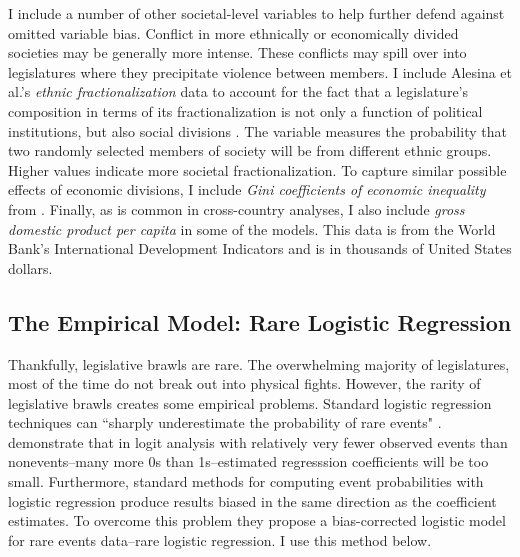 \documentclass[a4paper]{article}\usepackage{graphicx, color}
\begin{document}
I include a number of other societal-level variables to help further defend against omitted variable bias. Conflict in more ethnically or economically divided societies may be generally more intense. These conflicts may spill over into legislatures where they precipitate violence between members. I include Alesina et al.'s \citeyearpar{Alesina2003} {\emph{ethnic fractionalization}} data to account for the fact that a legislature's composition in terms of its fractionalization is not only a function of political institutions, but also social divisions \citep{Neto1997, Mozaffar2003}. The variable measures the probability that two randomly selected members of society will be from different ethnic groups. Higher values indicate more societal fractionalization. To capture similar possible effects of economic divisions, I include {\emph{Gini coefficients of economic inequality}} from \cite{UNU2008}. Finally, as is common in cross-country analyses, I also include {\emph{gross domestic product per capita}} in some of the models. This data is from the World Bank's International Development Indicators \citeyearpar{WorldBank2011} and is in thousands of United States dollars.

\subsection{The Empirical Model: Rare Logistic Regression}

Thankfully, legislative brawls are rare. The overwhelming majority of legislatures, most of the time do not break out into physical fights. However, the rarity of legislative brawls creates some empirical problems. Standard logistic regression techniques can ``sharply underestimate the probability of rare events" \cite[137]{KingRareEventsPA2001}. \cite{KingRareEventsPA2001} demonstrate that in logit analysis with relatively very fewer observed events than nonevents--many more 0s than 1s--estimated regresssion coefficients will be too small. Furthermore, standard methods for computing event probabilities with logistic regression produce results biased in the same direction as the coefficient estimates. To overcome this problem they propose a bias-corrected logistic model for rare events data--rare logistic regression. I use this method below.
\end{document}
